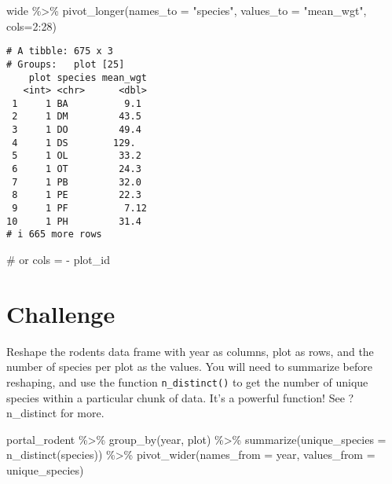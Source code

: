 \documentclass[
  letterpaper,
  DIV=11,
  numbers=noendperiod]{scrartcl}
\newenvironment{Shaded}{\begin{snugshade}}{\end{snugshade}}
\newcommand{\AttributeTok}[1]{\textcolor[rgb]{0.40,0.45,0.13}{#1}}
\newcommand{\CommentTok}[1]{\textcolor[rgb]{0.37,0.37,0.37}{#1}}
\newcommand{\DecValTok}[1]{\textcolor[rgb]{0.68,0.00,0.00}{#1}}
\newcommand{\FunctionTok}[1]{\textcolor[rgb]{0.28,0.35,0.67}{#1}}
\newcommand{\NormalTok}[1]{\textcolor[rgb]{0.00,0.23,0.31}{#1}}
\newcommand{\SpecialCharTok}[1]{\textcolor[rgb]{0.37,0.37,0.37}{#1}}
\newcommand{\StringTok}[1]{\textcolor[rgb]{0.13,0.47,0.30}{#1}}
\begin{document}
\begin{Shaded}
\begin{Highlighting}[]
\NormalTok{wide }\SpecialCharTok{\%\textgreater{}\%} 
  \FunctionTok{pivot\_longer}\NormalTok{(}\AttributeTok{names\_to =} \StringTok{"species"}\NormalTok{, }\AttributeTok{values\_to =} \StringTok{"mean\_wgt"}\NormalTok{, }\AttributeTok{cols=}\DecValTok{2}\SpecialCharTok{:}\DecValTok{28}\NormalTok{)}
\end{Highlighting}
\end{Shaded}

\begin{verbatim}
# A tibble: 675 x 3
# Groups:   plot [25]
    plot species mean_wgt
   <int> <chr>      <dbl>
 1     1 BA          9.1 
 2     1 DM         43.5 
 3     1 DO         49.4 
 4     1 DS        129.  
 5     1 OL         33.2 
 6     1 OT         24.3 
 7     1 PB         32.0 
 8     1 PE         22.3 
 9     1 PF          7.12
10     1 PH         31.4 
# i 665 more rows
\end{verbatim}

\begin{Shaded}
\begin{Highlighting}[]
\CommentTok{\# or cols = {-} plot\_id}
\end{Highlighting}
\end{Shaded}

\hypertarget{challenge}{%
\section{Challenge}\label{challenge}}

Reshape the rodents data frame with year as columns, plot as rows, and
the number of species per plot as the values. You will need to summarize
before reshaping, and use the function \texttt{n\_distinct()} to get the
number of unique species within a particular chunk of data. It's a
powerful function! See ?n\_distinct for more.

\begin{Shaded}
\begin{Highlighting}[]
\NormalTok{portal\_rodent }\SpecialCharTok{\%\textgreater{}\%} 
  \FunctionTok{group\_by}\NormalTok{(year, plot) }\SpecialCharTok{\%\textgreater{}\%} 
  \FunctionTok{summarize}\NormalTok{(}\AttributeTok{unique\_species =} \FunctionTok{n\_distinct}\NormalTok{(species)) }\SpecialCharTok{\%\textgreater{}\%} 
  \FunctionTok{pivot\_wider}\NormalTok{(}\AttributeTok{names\_from =}\NormalTok{ year, }\AttributeTok{values\_from =}\NormalTok{ unique\_species)}
\end{Highlighting}
\end{Shaded}
\end{document}
